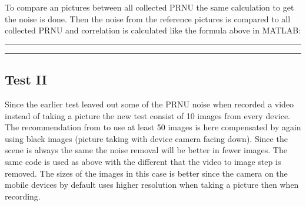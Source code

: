 To compare an pictures between all collected PRNU the same calculation to get the noise is done. Then the noise from the reference pictures is compared to all collected PRNU and correlation is calculated like the formula above in MATLAB:\\
\rule{\textwidth}{0.5pt}
  
\rule{\textwidth}{0.5pt}

\subsection{Test II}
Since the earlier test leaved out some of the PRNU noise when recorded a video instead of taking a picture the new test consist of 10 images from every device. The recommendation from \cite{sensor:camera:DCIdent} to use at least 50 images is here compensated by again using black images (picture taking with device camera facing down). Since the scene is always the same the noise removal will be better in fewer images. The same code is used as above with the different that the video to image step is removed. The sizes of the images in this case is better since the camera on the mobile devices by default uses higher resolution when taking a picture then when recording. 


